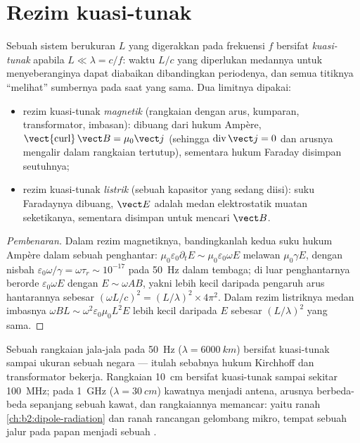 \section{Rezim kuasi-tunak}

\begin{definition}\label{def:b2:maxwell-equations:arqs}
Sebuah sistem berukuran $L$ yang digerakkan pada frekuensi $f$ bersifat \emph{kuasi-tunak}
apabila $L \ll \lambda = c/f$: waktu $L/c$ yang diperlukan medannya untuk menyeberanginya
dapat diabaikan dibandingkan periodenya, dan semua titiknya ``melihat''
sumbernya pada saat yang sama. Dua limitnya dipakai:
\begin{itemize}
  \item rezim kuasi-tunak \emph{magnetik} (rangkaian dengan
        arus, kumparan, transformator, imbasan): 
        dibuang dari hukum Ampère, $\operatorname{\vect{curl}}\vect B
        = \mu_0\vect j$ (sehingga $\operatorname{div}\vect j = 0$ dan arusnya mengalir dalam
        rangkaian tertutup), sementara hukum Faraday disimpan seutuhnya;
  \item rezim kuasi-tunak \emph{listrik} (sebuah kapasitor yang
        sedang diisi): suku Faradaynya dibuang, $\vect E$ adalah
        medan elektrostatik muatan seketikanya, sementara
         disimpan untuk mencari $\vect B$.
\end{itemize}
\end{definition}

\begin{proof}[Pembenaran]
Dalam rezim magnetiknya, bandingkanlah kedua suku hukum Ampère dalam sebuah
penghantar: $\mu_0\varepsilon_0\partial_t E \sim \mu_0\varepsilon_0\omega E$ melawan $\mu_0\gamma E$,
dengan nisbah $\varepsilon_0\omega/\gamma = \omega\tau_r \sim 10^{-17}$ pada \qty{50}{Hz} dalam tembaga;
di luar penghantarnya  berorde
$\varepsilon_0\omega E$ dengan $E \sim \omega AB$, yakni lebih kecil daripada pengaruh arus
hantarannya sebesar $(\omega L/c)^2 = (L/\lambda)^2 \times 4\pi^2$. Dalam rezim
listriknya medan imbasnya $\omega BL \sim \omega^2\varepsilon_0\mu_0L^2E$ lebih kecil daripada $E$
sebesar $(L/\lambda)^2$ yang sama.
\end{proof}

\begin{example}\label{ex:b2:maxwell-equations:sizes}
Sebuah rangkaian jala-jala pada \qty{50}{Hz} ($\lambda = \qty{6000}{km}$) bersifat kuasi-tunak
sampai ukuran sebuah negara --- itulah sebabnya hukum Kirchhoff dan
transformator bekerja. Rangkaian \qty{10}{cm} bersifat kuasi-tunak sampai sekitar
\qty{100}{MHz}; pada \qty{1}{GHz} ($\lambda = \qty{30}{cm}$) kawatnya menjadi antena,
arusnya berbeda-beda sepanjang sebuah kawat, dan rangkaiannya memancar: yaitu ranah
\cref{ch:b2:dipole-radiation} dan ranah rancangan gelombang mikro, tempat sebuah jalur pada
papan menjadi sebuah .
\end{example}

